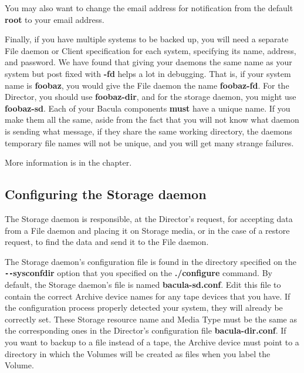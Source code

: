 You may also want to change the email address for notification from the
default {\bf root} to your email address. 

Finally, if you have multiple systems to be backed up, you will need a
separate File daemon or Client specification for each system, specifying its
name, address, and password. We have found that giving your daemons the same
name as your system but post fixed with {\bf -fd} helps a lot in debugging.
That is, if your system name is {\bf foobaz}, you would give the File daemon
the name {\bf foobaz-fd}. For the Director, you should use {\bf foobaz-dir},
and for the storage daemon, you might use {\bf foobaz-sd}. 
Each of your Bacula components {\bf must} have a unique name.  If you
make them all the same, aside from the fact that you will not
know what daemon is sending what message, if they share the same
working directory, the daemons temporary file names will not
be unique, and you will get many strange failures.

More information is in the
 chapter.

\subsection{Configuring the Storage daemon}

The Storage daemon is responsible, at the Director's request, for accepting
data from a File daemon and placing it on Storage media, or in the case of a
restore request, to find the data and send it to the File daemon. 

The Storage daemon's configuration file is found in the directory specified on
the {\bf \verb:--:sysconfdir} option that you specified on the {\bf ./configure}
command. By default, the Storage daemon's file is named {\bf bacula-sd.conf}.
Edit this file to contain the correct Archive device names for any tape
devices that you have. If the configuration process properly detected your
system, they will already be correctly set. These Storage resource name and
Media Type must be the same as the corresponding ones in the Director's
configuration file {\bf bacula-dir.conf}. If you want to backup to a file
instead of a tape, the Archive device must point to a directory in which the
Volumes will be created as files when you label the Volume. 
\label{ConfigTesting}

